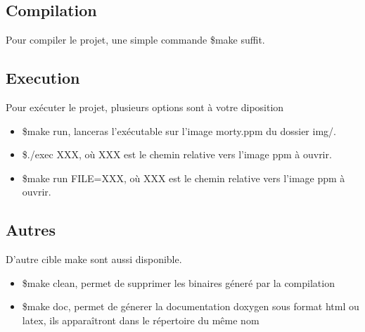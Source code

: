 \documentclass[12pt, letterpaper]{article}
\begin{document}
\subsection{Compilation}
Pour compiler le projet, une simple commande \$make suffit.

\subsection{Execution}
Pour exécuter le projet, plusieurs options sont à votre diposition
\begin{itemize}
    \item \$make run, lanceras l'exécutable sur l'image morty.ppm du dossier img/.
    \item \$./exec XXX, où XXX est le chemin relative vers l'image ppm à ouvrir.
    \item \$make run FILE=XXX, où XXX est le chemin relative vers l'image ppm à ouvrir.
\end{itemize}
\subsection{Autres}
D'autre cible make sont aussi disponible.
\begin{itemize}
    \item \$make clean, permet de supprimer les binaires géneré par la compilation
    \item \$make doc, permet de génerer la documentation doxygen sous format html ou latex, ils apparaîtront dans le répertoire du même nom
    
\end{itemize}
\end{document}
